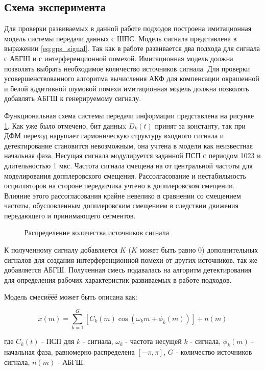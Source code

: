 \subsection{Схема эксперимента}
Для проверки развиваемых в данной работе подходов построена имитационная модель системы передачи данных с ШПС.
Модель сигнала представлена в выражении \ref{eq:gps_signal}. Так как в работе развивается два подхода для сигнала
с АБГШ и с интерференционной помехой. Имитационная модель должна позволять выбрать необходимое количество источников сигнала.
Для проверки усовершенствованного алгоритма вычисления АКФ для компенсации окрашенной и белой аддитивной шумовой помехи
имитационная модель должна позволять добавлять АБГШ к генерируемому сигналу. 

Функциональная схема системы передачи информации представлена на рисунке \ref{pic:sec4_modeling_general}. Как уже было отмечено, бит данныx ${D_k(t)}$
принят за константу, так при ДФМ переход нарушает гармоническую структуру входного сигнала и детектирование становится невозможным,
она учтена в модели как неизвестная начальная фаза. Несущая сигнала модулируется заданной ПСП с периодом 1023 и длительностью 1 мкс.
Частота сигнала смещена на от центральной частоты для моделирования допплеровского смещения. Рассолгасование и нестабильность
осцилляторов на стороне передатчика учтено в допплеровском смещении. Влияние этого рассогласования крайне невелико в сравнении
со смещением частоты, обусловленным допплеровским смещением в следствии движения передающего и принимающего сегментов.
\noindent
\begin{figure}[ht]
	\center{}
	\caption{Распределение количества источников сигнала}
	\label{pic:sec4_modeling_general}
\end{figure}

К полученному сигналу добавляется ${K}$ (${K}$ может быть равно 0) дополнительных сигналов для создания интерференционной помехи от других источников,
так же добавляется АБГШ. Полученная смесь подавалась на алгоритм детектирования для определения рабочих характеристик развиваемых в работе подходов.

Модель смесиёёё может быть описана как:
\begin{center}
\begin{equation}
	\label{eq:sec4_model}
	x(m) = \sum \limits_{k=1}^{G} \left[ C_k(m)\cos(\omega_{k}m + \phi_k(m)) \right] + n(m)
\end{equation}
\end{center}
где ${C_k(t)}$ - ПСП для ${k}$ - сигнала, ${\omega_{k}}$ - частота несущей ${k}$ - сигнала, ${\phi_k(m)}$ - начальная фаза,
равномерно распределена ${[-\pi, \pi]}$, ${G}$ - количество источников сигнала, ${n(m)}$ - АБГШ.

